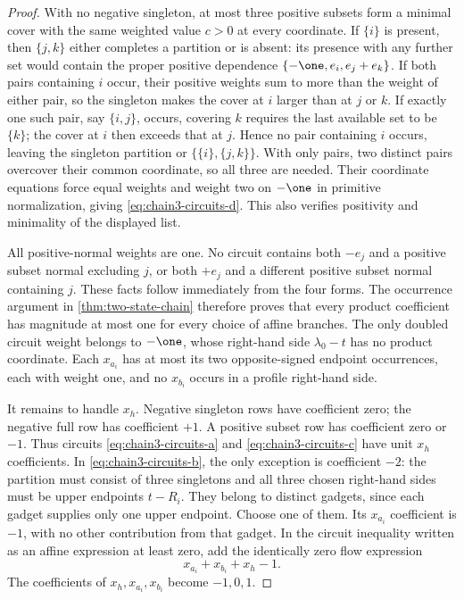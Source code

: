 \begin{proof}
With no negative singleton, at most three positive subsets form a
minimal cover with the same weighted value $c>0$ at every coordinate.
If $\{i\}$ is present, then $\{j,k\}$ either completes a partition
or is absent: its presence with any further set would contain the
proper positive dependence $\{-\one,e_i,e_j+e_k\}$.
If both pairs containing $i$ occur, their positive weights sum to
more than the weight of either pair, so the singleton makes the cover
at $i$ larger than at $j$ or $k$. If exactly one such pair, say
$\{i,j\}$, occurs, covering $k$ requires the last available set
to be $\{k\}$; the cover at $i$ then exceeds that at $j$.
Hence no pair containing $i$ occurs, leaving the singleton partition
or $\{\{i\},\{j,k\}\}$. With only pairs, two distinct pairs
overcover their common coordinate, so all three are needed. Their
coordinate equations force equal weights and weight two on $-\one$
in primitive normalization, giving \eqref{eq:chain3-circuits-d}.
This also verifies positivity and minimality of the displayed list.

All positive-normal weights are one. No circuit contains both
$-e_j$ and a positive subset normal excluding $j$, or both
$+e_j$ and a different positive subset normal containing $j$.
These facts follow immediately from the four forms. The occurrence
argument in \cref{thm:two-state-chain} therefore proves that every
product coefficient has magnitude at most one for every choice of
affine branches. The only doubled circuit weight belongs to
$-\one$, whose right-hand side $\lambda_0-t$ has no product
coordinate. Each $x_{a_i}$ has at most its two opposite-signed
endpoint occurrences, each with weight one, and no $x_{b_i}$
occurs in a profile right-hand side.

It remains to handle $x_h$. Negative singleton rows have coefficient
zero; the negative full row has coefficient $+1$. A positive
subset row has coefficient zero or $-1$. Thus circuits
\eqref{eq:chain3-circuits-a} and \eqref{eq:chain3-circuits-c}
have unit $x_h$ coefficients. In
\eqref{eq:chain3-circuits-b}, the only exception is coefficient
$-2$: the partition must consist of three singletons and all three
chosen right-hand sides must be upper endpoints $t-R_i$.
They belong to distinct gadgets, since each gadget supplies only
one upper endpoint. Choose one of them. Its $x_{a_i}$ coefficient
is $-1$, with no other contribution from that gadget. In the
circuit inequality written as an affine expression at least zero,
add the identically zero flow expression
\[
 x_{a_i}+x_{b_i}+x_h-1.
\]
The coefficients of $x_h,x_{a_i},x_{b_i}$ become $-1,0,1$.


\end{proof}
